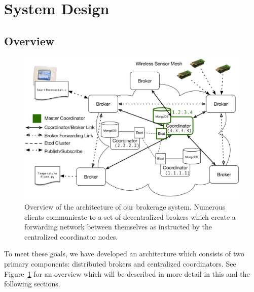 \section{System Design} \label{section:coordinator}


\subsection{Overview}

\begin{figure}[t]
\centering
\includegraphics[width=6.5in]{figs/full_architecture.pdf}
\caption{Overview of the architecture of our brokerage system.
Numerous clients communicate to a set of decentralized brokers which create a forwarding network between themselves as instructed by the centralized coordinator nodes.}
\label{fig:architecture}
\end{figure}

To meet these goals, we have developed an architecture which consists of two primary components: distributed brokers and centralized coordinators.
See Figure~\ref{fig:architecture} for an overview which will be described in more detail in this and the following sections.

